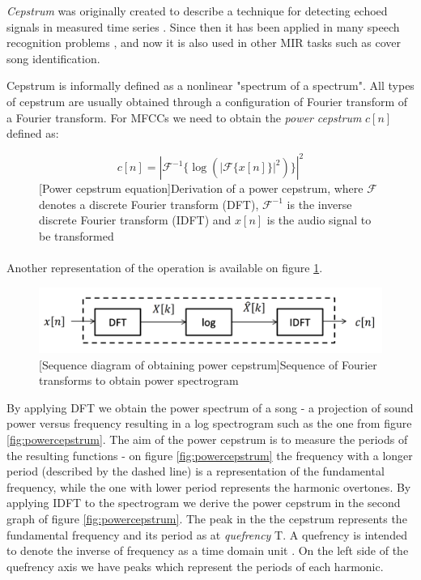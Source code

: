 \textit{Cepstrum} was originally created to describe a technique for detecting
echoed signals in measured time series \cite{martin1986power}. Since then it has
been applied in many speech recognition problems \cite{muda2010voice}
\cite{viikki1998cepstral}, and now it is also used in other MIR tasks such as
cover song identification.

Cepstrum is informally defined as a nonlinear "spectrum of a spectrum". All
types of cepstrum are usually obtained through a configuration of Fourier
transform of a Fourier transform. For MFCCs we need to obtain the \textit{power
cepstrum} $c[n]$ defined as:
\begin{figure}[H]
    \begin{equation}
        c[n] = |\mathcal{F}^{-1}\{\log{}(|\mathcal{F}\{ x[n]\}|^2)\}|^2
    \end{equation}
    [Power cepstrum equation]{Derivation of a power cepstrum, where $\mathcal{F}$ denotes a discrete Fourier transform (DFT), $\mathcal{F}^{-1}$ is the inverse discrete Fourier transform (IDFT) and $x[n]$ is the audio signal to be transformed \cite{wiki:cepstrum}}
\end{figure}

\paragraph{}
Another representation of the operation is available on figure \ref{fig:powerspectrumsequence}.

\begin{figure}[H]
    \centering
    \includegraphics[width=\textwidth]{Algorithms/powercepstrum.png}
    [Sequence diagram of obtaining power cepstrum]{Sequence of Fourier transforms to obtain power spectrogram \cite{cepstrumgraph}}
    \label{fig:powerspectrumsequence}
\end{figure}

By applying DFT we obtain the power spectrum of a song - a projection of sound
power versus frequency resulting in a log spectrogram such as the one from
figure \ref{fig:powercepstrum}. The aim of the power cepstrum is to measure the
periods of the resulting functions - on figure \ref{fig:powercepstrum} the
frequency with a longer period (described by the dashed line) is a
representation of the fundamental frequency, while the one with lower period
represents the harmonic overtones. By applying IDFT to the spectrogram we derive
the power cepstrum in the second graph of figure \ref{fig:powercepstrum}. The
peak in the the cepstrum represents the fundamental frequency and its period as
at \textit{quefrency} T. A quefrency is intended to denote the inverse of
frequency as a time domain unit \cite{cepstralanalysis}. On the left side of the
quefrency axis we have peaks which represent the periods of each harmonic.

